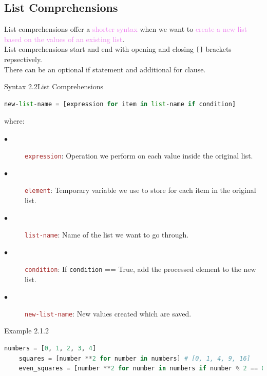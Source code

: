\documentclass{book}
\begin{document}
    \subsection{List Comprehensions}
    List comprehensions offer a \textcolor{violet}{shorter syntax} when we want to \textcolor{violet}{create a new list based on the values of an existing list}. \\ 
    List comprehensions start and end with opening and closing \texttt{[]} brackets repsectively. \\
    There can be an optional if statement and additional for clause.
    \begin{synBox}[]{Syntax 2.2}{List Comprehensions}
    \begin{lstlisting}[language=Python, basicstyle=\ttfamily\small, keywordstyle=\color{blue}, commentstyle=\color{forestgreen}, stringstyle=\color{red}, showstringspaces=false]
                new-list-name = [expression for item in list-name if condition]
    \end{lstlisting}
        \raggedright
        where: \\
        \begin{description}
            \item[$\bullet$] \textcolor{brown}{\texttt{expression}}: Operation we perform on each value inside the original list.
            \item[$\bullet$] \textcolor{brown}{\texttt{element}}: Temporary variable we use to store for each item in the original list.
            \item[$\bullet$] \textcolor{brown}{\texttt{list-name}}: Name of the list we want to go through.
            \item[$\bullet$] \textcolor{brown}{\texttt{condition}}: If \texttt{condition} == True, add the processed element to the new list.
            \item[$\bullet$] \textcolor{brown}{\texttt{new-list-name}}: New values created which are saved.
        \end{description}
    \end{synBox}
    \newpage
    \begin{egBox}[]{Example 2.1.2}{}
    \begin{lstlisting}[language=Python, basicstyle=\ttfamily\small, keywordstyle=\color{blue}, commentstyle=\color{forestgreen}, stringstyle=\color{red}, showstringspaces=false]
    numbers = [0, 1, 2, 3, 4]
    squares = [number **2 for number in numbers] # [0, 1, 4, 9, 16]
    even_squares = [number **2 for number in numbers if number % 2 == 0] # [0, 4, 16]
    \end{lstlisting}
    \end{egBox}
\end{document}
